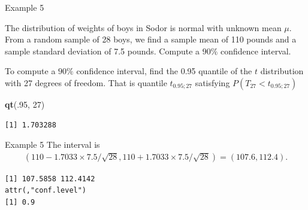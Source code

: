\documentclass[
  ignorenonframetext,
]{beamer}
\newenvironment{Shaded}{\begin{snugshade}}{\end{snugshade}}
\newcommand{\AttributeTok}[1]{\textcolor[rgb]{0.13,0.29,0.53}{#1}}
\newcommand{\CommentTok}[1]{\textcolor[rgb]{0.56,0.35,0.01}{\textit{#1}}}
\newcommand{\DecValTok}[1]{\textcolor[rgb]{0.00,0.00,0.81}{#1}}
\newcommand{\FloatTok}[1]{\textcolor[rgb]{0.00,0.00,0.81}{#1}}
\newcommand{\FunctionTok}[1]{\textcolor[rgb]{0.13,0.29,0.53}{\textbf{#1}}}
\newcommand{\NormalTok}[1]{#1}
\newcommand{\SpecialCharTok}[1]{\textcolor[rgb]{0.81,0.36,0.00}{\textbf{#1}}}
\begin{document}
\begin{frame}[fragile]{Example 5}
\protect\hypertarget{example-5}{}
\begin{tcolorbox}
The distribution of weights of boys in Sodor is normal with unknown mean $\mu$. From a random sample of 28 boys, we find a sample mean of 110 pounds and a sample standard deviation of 7.5 pounds. Compute a $90\%$ confidence interval. 
\end{tcolorbox}

To compute a \(90\%\) confidence interval, find the 0.95 quantile of the
\(t\) distribution with 27 degrees of freedom. That is quantile
\(t_{0.95;27}\) satisfying \(P(T_{27}<t_{0.95;27})\)

\normalsize

\begin{Shaded}
\begin{Highlighting}[]
\FunctionTok{qt}\NormalTok{(.}\DecValTok{95}\NormalTok{, }\DecValTok{27}\NormalTok{)}
\end{Highlighting}
\end{Shaded}

\begin{verbatim}
[1] 1.703288
\end{verbatim}

\normalsize
\end{frame}

\begin{frame}[fragile]{Example 5}
\protect\hypertarget{example-5-1}{}
The interval is \[\begin{array}{ll}
(110-1.7033\times 7.5/\sqrt{28},110+1.7033\times 7.5/\sqrt{28})=(107.6, 112.4).
\end{array}\]

\normalsize

\begin{Shaded}
\end{Shaded}

\begin{verbatim}
[1] 107.5858 112.4142
attr(,"conf.level")
[1] 0.9
\end{verbatim}

\normalsize
\end{frame}
\end{document}
